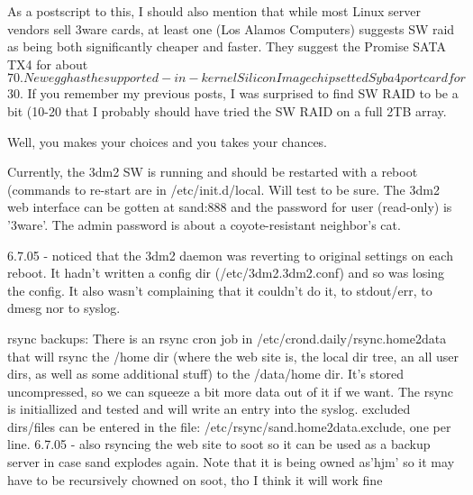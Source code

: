 \documentclass[12pt,twoside]{article}
\begin{document}
As a postscript to this, I should also mention that while most Linux server 
vendors sell 3ware cards, at least one (Los Alamos Computers) suggests SW 
raid as being both significantly cheaper and faster.  They suggest the 
Promise SATA TX4 for about $70.  Newegg has the supported-in-kernel Silicon 
Image chipsetted Syba 4 port card for $30. If you remember my previous posts, 
I was surprised to find SW RAID to be a bit (10-20%
that I probably should have tried the SW RAID on a full 2TB array.

Well, you makes your choices and you takes your chances.

Currently, the 3dm2 SW is running and should be restarted with a reboot 
(commands to re-start are in /etc/init.d/local.  Will test to be sure.
The 3dm2 web interface can be gotten at sand:888 and the password for 
user (read-only) is '3ware'.  
The admin password is about a coyote-resistant neighbor's cat.

6.7.05 - noticed that the 3dm2 daemon was reverting to original
settings on each reboot.  
It hadn't written a config dir (/etc/3dm2.3dm2.conf) and so was losing  
the config. 
It also wasn't complaining that it couldn't do it, to stdout/err, to dmesg 
nor to syslog.

rsync backups:  There is an rsync cron job in /etc/crond.daily/rsync.home2data
that will rsync the /home dir (where the web site is, the local dir tree, 
an all user dirs, as well as some additional stuff) to the /data/home dir.  
It's stored uncompressed, so we can squeeze a bit more data out of it if we 
want.  The rsync is initiallized and tested and will write an entry into the 
syslog.  excluded dirs/files can be entered in the file: 
/etc/rsync/sand.home2data.exclude, one per line.
6.7.05 - also rsyncing the web site to soot so it can be used as a backup server 
in case sand explodes again.  Note that it is being owned as'hjm' so it may have 
to be recursively chowned on soot, tho I think it will work fine
\end{document}
